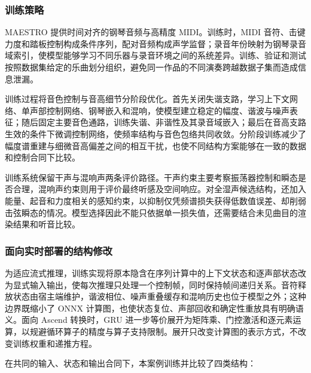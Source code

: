 \subsubsection{训练策略}\label{src-experiment-case3-piano-ddsp-training}

MAESTRO 提供时间对齐的钢琴音频与高精度 MIDI。训练时，MIDI
音符、击键力度和踏板控制构成条件序列，配对音频构成声学监督；录音年份映射为钢琴录音域索引，使模型能够学习不同乐器与录音环境之间的系统差异。训练、验证和测试按照数据集给定的乐曲划分组织，避免同一作品的不同演奏跨越数据子集而造成信息泄漏。

训练过程将音色控制与音高细节分阶段优化。首先关闭失谐支路，学习上下文网络、单声部控制网络、钢琴嵌入和混响，使模型建立稳定的幅度、谐波与噪声表征；随后固定主要音色通路，训练失谐、非谐性及其录音域嵌入；最后在音高支路生效的条件下微调控制网络，使频率结构与音色包络共同收敛。分阶段训练减少了幅度谱重建与细微音高偏差之间的相互干扰，也使不同结构方案能够在一致的数据和控制合同下比较。

训练系统保留干声与混响声两条评价路径。干声约束主要考察振荡器控制和瞬态是否合理，混响声约束则用于评价最终听感及空间响应。对全湿声候选结构，还加入能量、起音和力度相关的感知约束，以抑制仅凭频谱损失获得低数值误差、却削弱击弦瞬态的情况。模型选择因此不能只依据单一损失值，还需要结合未见曲目的渲染结果和听音比较。

\subsubsection{面向实时部署的结构修改}\label{src-experiment-case3-piano-ddsp-modifications}

为适应流式推理，训练实现将原本隐含在序列计算中的上下文状态和逐声部状态改为显式输入输出，使每次推理只处理一个控制帧，同时保持帧间递归关系。音符释放状态由宿主端维护，谐波相位、噪声重叠缓存和混响历史也位于模型之外；这种边界既缩小了
ONNX 计算图，也使状态复位、声部回收和确定性重放具有明确语义。面向 Ascend
转换时，GRU
进一步等价展开为矩阵乘、门控激活和逐元素运算，以规避循环算子的精度与算子支持限制。展开只改变计算图的表示方式，不改变训练权重和递推方程。

在共同的输入、状态和输出合同下，本案例训练并比较了四类结构：


